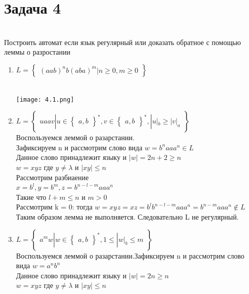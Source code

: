 \documentclass[a4paper]{article}
\begin{document}
\section{Задача 4}
\\ Построить автомат если язык регулярный или доказать обратное с помощью леммы о разростании 
\begin{enumerate}
    \item $L = \begin{Bmatrix}
(aab)^{n}b(aba)^{m} | n\geq 0, m \geq 0
\end{Bmatrix}$

\\ \texttt{[image: 4.1.png]}
    \item $L = \begin{Bmatrix}
uaav | u \in \begin{Bmatrix}
a, b
\end{Bmatrix}^{*},v \in \begin{Bmatrix}
a, b
\end{Bmatrix}^{*}, |u|_{b} \geq |v|_{a}
\end{Bmatrix}$
\\ Воспользуемся леммой о разарстании.
\\ Зафиксируем n и рассмотрим слово вида $w = b^{n}aaa^{n} \in L$
\\ Данное слово принадлежит языку и $|w| = 2n + 2 \geq n$
\\ $w = xyz$ где $y \ne \lambda$ и $|xy| \leq n$
\\ Рассмотрим разбиаение
\\ $x = b^{l}, y = b^{m}, z = b^{n -l-m}aaa^{n} $
\\ Такие что $l+m \leq n$ и $ m > 0$
\\ Рассмотрим k = 0: тогда $w = xy^{}z = xz = b^{l}b^{n-l-m}aaa^{n} = b^{n-m}aaa^{n} \notin L$
\\ Таким образом лемма не выполняется. Следовательно L не регулярный.
    \item $L = \begin{Bmatrix}
a^{m}w | w \in \begin{Bmatrix}
a, b
\end{Bmatrix}^{*}, 1 \leq |w|_{b} \leq m
\end{Bmatrix}$
\\ Воспользуемся леммой о разарстании.Зафиксируем n и рассмотрим слово вида $w = a^{n}b^{n}$
\\ Данное слово принадлежит языку и $|w| = 2n \geq n$
\\ $w = xyz$ где $y \ne \lambda$ и $|xy| \leq n$

\end{enumerate}
\end{document}
